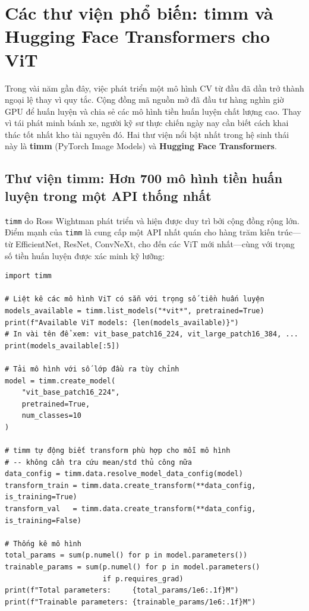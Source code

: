 \section{Các thư viện phổ biến: timm và Hugging Face Transformers cho ViT}
\label{sec:timm_hf}

Trong vài năm gần đây, việc phát triển một mô hình CV từ đầu đã dần trở thành ngoại lệ thay vì quy tắc. Cộng đồng mã nguồn mở đã đầu tư hàng nghìn giờ GPU để huấn luyện và chia sẻ các mô hình tiền huấn luyện chất lượng cao. Thay vì tái phát minh bánh xe, người kỹ sư thực chiến ngày nay cần biết cách khai thác tốt nhất kho tài nguyên đó. Hai thư viện nổi bật nhất trong hệ sinh thái này là \textbf{timm} (PyTorch Image Models) và \textbf{Hugging Face Transformers}.

\subsection*{Thư viện timm: Hơn 700 mô hình tiền huấn luyện trong một API thống nhất}

\texttt{timm} do Ross Wightman phát triển và hiện được duy trì bởi cộng đồng rộng lớn. Điểm mạnh của \texttt{timm} là cung cấp một API nhất quán cho hàng trăm kiến trúc---từ EfficientNet, ResNet, ConvNeXt, cho đến các ViT mới nhất---cùng với trọng số tiền huấn luyện được xác minh kỹ lưỡng:

\begin{verbatim}
import timm

# Liệt kê các mô hình ViT có sẵn với trọng số tiền huấn luyện
models_available = timm.list_models("*vit*", pretrained=True)
print(f"Available ViT models: {len(models_available)}")
# In vài tên để xem: vit_base_patch16_224, vit_large_patch16_384, ...
print(models_available[:5])

# Tải mô hình với số lớp đầu ra tùy chỉnh
model = timm.create_model(
    "vit_base_patch16_224",
    pretrained=True,
    num_classes=10
)

# timm tự động biết transform phù hợp cho mỗi mô hình
# -- không cần tra cứu mean/std thủ công nữa
data_config = timm.data.resolve_model_data_config(model)
transform_train = timm.data.create_transform(**data_config, is_training=True)
transform_val   = timm.data.create_transform(**data_config, is_training=False)

# Thống kê mô hình
total_params = sum(p.numel() for p in model.parameters())
trainable_params = sum(p.numel() for p in model.parameters()
                       if p.requires_grad)
print(f"Total parameters:     {total_params/1e6:.1f}M")
print(f"Trainable parameters: {trainable_params/1e6:.1f}M")
\end{verbatim}

